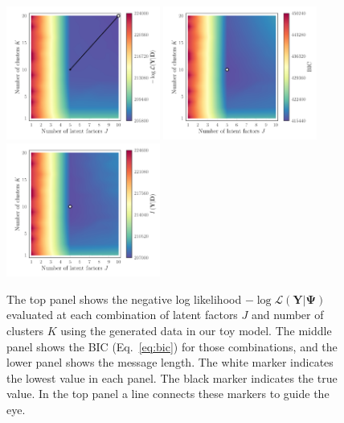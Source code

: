 \documentclass[twocolumn]{aastex62}
\newcommand{\vect}[1]{\boldsymbol{\mathbf{#1}}}
\renewcommand{\vec}[1]{\vect{#1}}
\newcommand{\data}{\textbf{Y}}
\newcommand{\NumLatentFactors}{J}
\newcommand{\NumComponents}{K}
\begin{document}
\begin{figure}
	\includegraphics[width=0.45\textwidth]{experiments/exp1-gridsearch-ll-contours.pdf}
	\includegraphics[width=0.45\textwidth]{experiments/exp1-gridsearch-bic-contours.pdf}
	\includegraphics[width=0.45\textwidth]{experiments/exp1-gridsearch-mml-contours.pdf}
    \caption{The top panel shows the negative log likelihood 
			 $-\log{\mathcal{L}\left(\data|\vec\Psi\right)}$ 
			 evaluated at each combination of latent factors 
			 $\NumLatentFactors$ and number of clusters 
			 $\NumComponents$ using the generated data in our toy model.
			 The middle panel shows 
			 the BIC (Eq.~\ref{eq:bic}) for those 
			 combinations, and the lower panel shows the 
			 message length. The white marker indicates the
			 lowest value in each panel.
			 The black marker indicates the true value. 
			 In the top panel a line connects these markers to guide the eye.}
    \label{fig:experiment-1-gridsearch}
\end{figure}
\end{document}
